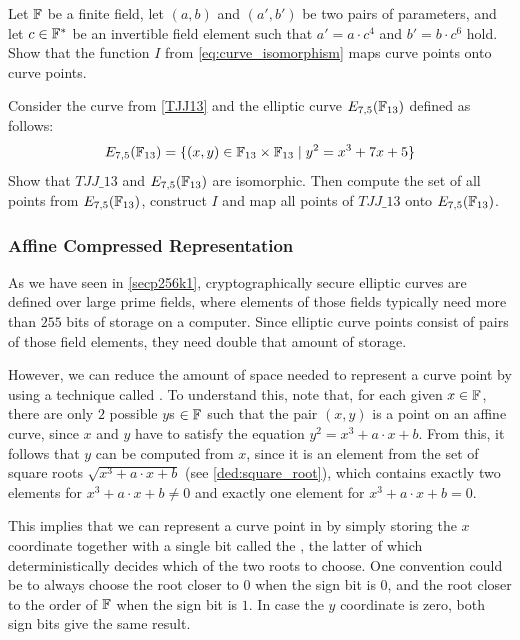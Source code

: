 \begin{exercise}
Let $\mathbb{F}$ be a finite field, let $(a,b)$ and $(a',b')$ be two pairs of parameters, and let $c\in \mathbb{F}^*$ be an invertible field element such that $a' = a\cdot c^4$ and $b' = b\cdot c^6$ hold. Show that the function $I$ from \eqref{eq:curve_isomorphism} maps curve points onto curve points.
\end{exercise}

\begin{exercise}
\label{ex:isomorphic_TJJ13} Consider the  curve from \examplename{} \ref{TJJ13} and the elliptic curve $E_{7,5}(\mathbb{F}_{13})$ defined as follows:
\begin{equation}
E_{7,5}(\mathbb{F}_{13}) = \{ (x,y)\in \mathbb{F}_{13}\times \mathbb{F}_{13}\;|\; y^2 = x^3 + 7x +5\}
\end{equation}
Show that $TJJ\_13$ and $E_{7,5}(\mathbb{F}_{13})$ are isomorphic. Then compute the set of all points from $E_{7,5}(\mathbb{F}_{13})$, construct $I$ and map all points of $TJJ\_13$ onto $E_{7,5}(\mathbb{F}_{13})$.
\end{exercise}

\subsubsection{Affine Compressed Representation}
\label{sec:affine_point_compression}
As we have seen in \examplename{} \ref{secp256k1}, cryptographically secure elliptic curves are defined over large prime fields, where elements of those fields typically need more than $255$ bits of storage on a computer. Since elliptic curve points consist of pairs of those field elements, they need double that amount of storage.

However, we can reduce the amount of space needed to represent a curve point by using a technique called . To understand this, note that, for each given $x\in\mathbb{F}$, there are only $2$ possible $y$s $\in \mathbb{F}$ such that the pair $(x,y)$ is a point on an affine  curve, since $x$ and $y$ have to satisfy the equation $y^2 = x^3 + a\cdot x + b$. From this, it follows that $y$ can be computed from $x$, since it is an element from the set of square roots $\sqrt{x^3 + a\cdot x +b}$ (see \ref{ded:square_root}), which contains exactly two elements for $x^3 + a\cdot x +b\neq 0$ and exactly one element for $x^3 + a\cdot x +b=0$. 

This implies that we can represent a curve point in  by simply storing the $x$ coordinate together with a single bit called the , the latter of which deterministically decides which of the two roots to choose. One convention could be to always choose the root closer to $0$ when the sign bit is $0$, and the root closer to the order of $\mathbb{F}$ when the sign bit is $1$. In case the $y$ coordinate is zero, both sign bits give the same result.

